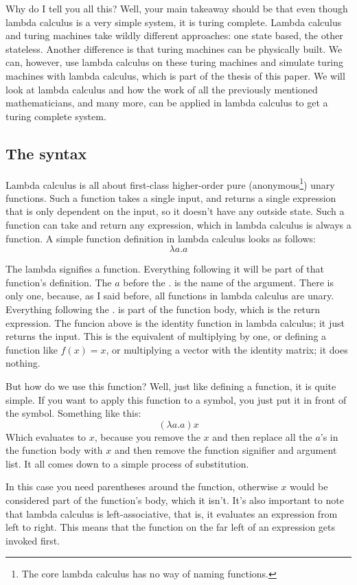 \documentclass[11pt]{article}
\begin{document}
Why do I tell you all this? Well, your main takeaway should be that even though
lambda calculus is a very simple system, it is turing complete. Lambda calculus
and turing machines take wildly different approaches: one state based, the
other stateless. Another difference is that turing machines can be physically
built. We can, however, use lambda calculus on these turing machines and
simulate turing machines with lambda calculus, which is part of the thesis of
this paper. We will look at lambda calculus and how the work of all the
previously mentioned mathematicians, and many more, can be applied in lambda
calculus to get a turing complete system.

\subsection{The syntax}

Lambda calculus is all about first-class higher-order pure
(anonymous\footnote{The core lambda calculus has no way of naming functions.})
unary functions. Such a function takes a single input, and returns a single
expression that is only dependent on the input, so it doesn't have any outside
state. Such a function can take and return any expression, which in lambda
calculus is always a function. A simple function definition in lambda calculus
looks as follows: \[\lambda a.a\]

The lambda signifies a function. Everything following it will be part of that
function's definition. The \(a\) before the \(.\) is the name of the argument.
There is only one, because, as I said before, all functions in lambda calculus
are unary. Everything following the \(.\) is part of the function body, which
is the return expression. The funcion above is the identity function in lambda
calculus; it just returns the input. This is the equivalent of multiplying by
one, or defining a function like \(f(x)=x\), or multiplying a vector with the
identity matrix; it does nothing.

But how do we use this function? Well, just like defining a function, it is
quite simple. If you want to apply this function to a symbol, you just put it
in front of the symbol. Something like this:
\[(\lambda a.a)x\]
Which evaluates to \(x\), because you remove the \(x\) and then replace all the
\(a\)'s in the function body with \(x\) and then remove the function signifier
and argument list. It all comes down to a simple process of substitution.

In this case you need parentheses around the function, otherwise \(x\) would be
considered part of the function's body, which it isn't. It's also important to
note that lambda calculus is left-associative, that is, it evaluates an
expression from left to right. This means that the function on the far left of
an expression gets invoked first.
\end{document}
